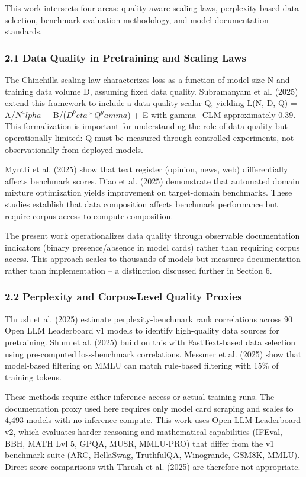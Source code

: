 
This work intersects four areas: quality-aware scaling laws, perplexity-based data selection, benchmark evaluation methodology, and model documentation standards.

\subsubsection{2.1 Data Quality in Pretraining and Scaling Laws}

The Chinchilla scaling law \citep{Hoffmann2022Training} characterizes loss as a function of model size N and training data volume D, assuming fixed data quality. Subramanyam et al. (2025) extend this framework to include a data quality scalar Q, yielding L(N, D, Q) = A/$N^alpha$ + B/($D^beta * Q^gamma$) + E with gamma\_CLM approximately 0.39. This formalization is important for understanding the role of data quality but operationally limited: Q must be measured through controlled experiments, not observationally from deployed models.

Myntti et al. (2025) show that text register (opinion, news, web) differentially affects benchmark scores. Diao et al. (2025) demonstrate that automated domain mixture optimization yields improvement on target-domain benchmarks. These studies establish that data composition affects benchmark performance but require corpus access to compute composition.

The present work operationalizes data quality through observable documentation indicators (binary presence/absence in model cards) rather than requiring corpus access. This approach scales to thousands of models but measures documentation rather than implementation -- a distinction discussed further in Section 6.

\subsubsection{2.2 Perplexity and Corpus-Level Quality Proxies}

Thrush et al. (2025) estimate perplexity-benchmark rank correlations across 90 Open LLM Leaderboard v1 models to identify high-quality data sources for pretraining. Shum et al. (2025) build on this with FastText-based data selection using pre-computed loss-benchmark correlations. Messmer et al. (2025) show that model-based filtering on MMLU can match rule-based filtering with 15\% of training tokens.

These methods require either inference access or actual training runs. The documentation proxy used here requires only model card scraping and scales to 4,493 models with no inference compute. This work uses Open LLM Leaderboard v2, which evaluates harder reasoning and mathematical capabilities (IFEval, BBH, MATH Lvl 5, GPQA, MUSR, MMLU-PRO) that differ from the v1 benchmark suite (ARC, HellaSwag, TruthfulQA, Winogrande, GSM8K, MMLU). Direct score comparisons with Thrush et al. (2025) are therefore not appropriate.

